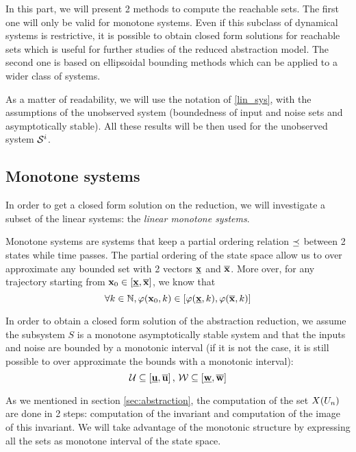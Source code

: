 In this part, we will present 2 methods to compute the reachable sets.
The first one will only be valid for monotone systems. Even if this subclass of dynamical systems is restrictive, it is possible to obtain closed form solutions for reachable sets which is useful for further studies of the reduced abstraction model.
The second one is based on ellipsoidal bounding methods which can be applied to a wider class of systems.


As a matter of readability, we will use the notation of \ref{lin_sys}, with the assumptions of the unobserved system (boundedness of input and noise sets and asymptotically stable).
All these results will be then used for the unobserved system $\mathcal{S}^i$.

\subsection{Monotone systems}
In order to get a closed form solution on the reduction, we will investigate a subset of the linear systems: the \textit{linear monotone systems}.


Monotone systems are systems that keep a partial ordering relation $\preceq$ between 2 states while time passes.
The partial ordering of the state space allow us to over approximate any bounded set with 2 vectors $\underline{ \mathbf{x}}$ and $\overline{ \mathbf{x}}$.
More over, for any trajectory starting from $ \mathbf{x}_0 \in [\underline{ \mathbf{x}},\overline{ \mathbf{x}}]$, we know that
\begin{equation}
\forall k \in \mathbb{N}, \varphi( \mathbf{x}_0,k) \in [\varphi(\underline{ \mathbf{x}},k),\varphi(\overline{ \mathbf{x}},k)]
\end{equation}

In order to obtain a closed form solution of the abstraction reduction, we assume the subsystem $S$ is a monotone asymptotically stable system and that the inputs and noise are bounded by a monotonic interval (if it is not the case, it is still possible to over approximate the bounds with a monotonic interval):
\begin{equation*}
\mathcal{U} \subseteq \left [ \underline{ \mathbf{u}}, \overline{ \mathbf{u}} \right ]
\textrm{, }
\mathcal{W} \subseteq \left [ \underline{ \mathbf{w}}, \overline{ \mathbf{w}} \right ]
\end{equation*}

As we mentioned in section \ref{sec:abstraction}, the computation of the set $X(U_n)$ are done in 2 steps: computation of the invariant and computation of the image of this invariant.
We will take advantage of the monotonic structure by expressing all the sets as monotone interval of the state space.


